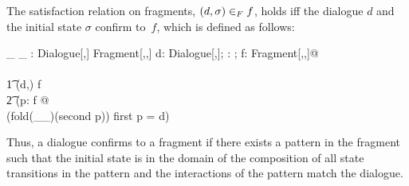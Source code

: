 The satisfaction relation on fragments, $(d,\sigma) \in_{F} f$, holds iff
the dialogue $d$ and the initial state $\sigma$ confirm to~$f$,
which is defined as follows:

\begin{zedgroup}
\begin{zdirectives}
  \zrelation{(\_ \ucin \_)}
\end{zdirectives}
\begin{axdef}[\alpha,\pi,\Sigma]
  \_ \ucin \_ : Dialogue[\alpha,\pi] \cross \Sigma \rel 
                  Fragment[\alpha,\pi,\Sigma]
\where
  \forall \<d: Dialogue[\alpha,\pi]; \sigma: \Sigma; 
          f: Fragment[\alpha,\pi,\Sigma]@\\\>\\\t1
    (d,\sigma) \ucin f \iff \\\t2
    (\exists \<p: f @ \\ %
                     \sigma \in \dom(fold(\_\comp\_)(second \circ p)) 
                            \land 
                       first \circ p = d)\>
\end{axdef}
\end{zedgroup}

\noindent
Thus, a dialogue confirms to a fragment if there exists a pattern in
the fragment such that the initial state is in the domain of the
composition of all state transitions in the pattern and the
interactions of the pattern match the dialogue.

